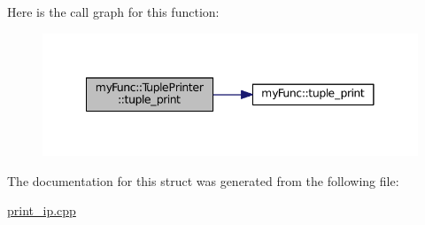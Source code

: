 Here is the call graph for this function\+:
\nopagebreak
\begin{figure}[H]
\begin{center}
\leavevmode
\includegraphics[width=341pt]{structmyFunc_1_1TuplePrinter_ac5e1b24bcfeb6b1f482babfc35eec03d_cgraph}
\end{center}
\end{figure}




The documentation for this struct was generated from the following file\+:\begin{DoxyCompactItemize}
\item 
\hyperlink{print__ip_8cpp}{print\+\_\+ip.\+cpp}\end{DoxyCompactItemize}
